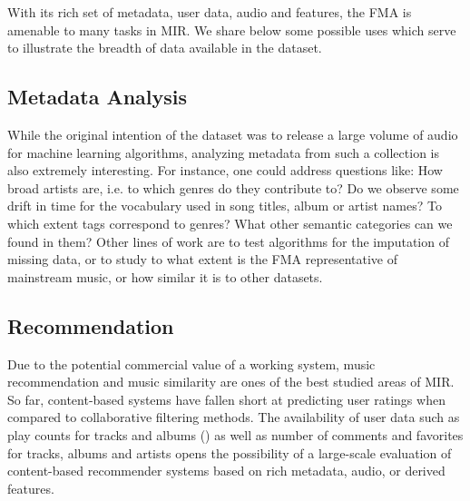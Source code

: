 \documentclass{article}
\begin{document}
With its rich set of metadata, user data, audio and features, the FMA is amenable to many tasks in MIR. We share below some possible uses which serve to illustrate the breadth of data available in the dataset.





\subsection{Metadata Analysis}

While the original intention of the dataset was to release a large volume of audio for machine learning algorithms, analyzing metadata from such a collection is also extremely interesting.
For instance, one could address questions like: How broad artists are, i.e. to which genres do they contribute to? Do we observe some drift in time for the vocabulary used in song titles, album or artist names? To which extent tags correspond to genres? What other semantic categories can we found in them?
Other lines of work are to test algorithms for the imputation of missing data, or to study to what extent is the FMA representative of mainstream music, or how similar it is to other datasets.

\subsection{Recommendation} %

Due to the potential commercial value of a working system, music recommendation and music similarity are ones of the best studied areas of MIR. So far, content-based systems have fallen short at predicting user ratings when compared to collaborative filtering methods.
The availability of user data such as play counts for tracks and albums () as well as number of comments and favorites for tracks, albums and artists opens the possibility of a large-scale evaluation of content-based recommender systems based on rich metadata, audio, or derived features.
\end{document}
